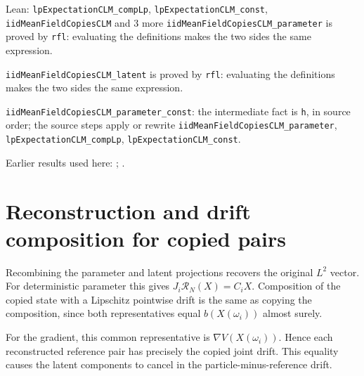 \documentclass[11pt,a4paper]{article}
\begin{document}
\begin{leanbox}{Lean: \texttt{lpExpectationCLM\_\allowbreak{}compLp}, \texttt{lpExpectationCLM\_\allowbreak{}const}, \texttt{iidMeanFieldCopiesCLM} and 3 more}
\texttt{iid\allowbreak{}Mean\allowbreak{}Field\allowbreak{}Copies\allowbreak{}CLM\_\allowbreak{}parameter} is proved by \texttt{rfl}: evaluating the definitions makes the two sides the same expression.



\texttt{iid\allowbreak{}Mean\allowbreak{}Field\allowbreak{}Copies\allowbreak{}CLM\_\allowbreak{}latent} is proved by \texttt{rfl}: evaluating the definitions makes the two sides the same expression.



\texttt{iid\allowbreak{}Mean\allowbreak{}Field\allowbreak{}Copies\allowbreak{}CLM\_\allowbreak{}parameter\_\allowbreak{}const}: the intermediate fact is \texttt{h}, in source order; the source steps apply or rewrite \texttt{iid\allowbreak{}Mean\allowbreak{}Field\allowbreak{}Copies\allowbreak{}CLM\_\allowbreak{}parameter}, \texttt{lp\allowbreak{}Expectation\allowbreak{}CLM\_\allowbreak{}comp\allowbreak{}Lp}, \texttt{lp\allowbreak{}Expectation\allowbreak{}CLM\_\allowbreak{}const}.
\end{leanbox}


Earlier results used here: \cite[Section~3.1.1]{LangevinLean2026IPLA}; \cite[Section~3.11.1]{LangevinLean2026IPLA}.

\section{\texorpdfstring{Reconstruction and drift composition for copied pairs}{Reconstruction and drift composition for copied pairs}}


Recombining the parameter and latent projections recovers the original \(L^2\) vector. For deterministic parameter this gives \(J_i\mathcal R_N(X)=C_iX\). Composition of the copied state with a Lipschitz pointwise drift is the same as copying the composition, since both representatives equal \(b(X(\omega_i))\) almost surely.



For the gradient, this common representative is \(\nabla V(X(\omega_i))\). Hence each reconstructed reference pair has precisely the copied joint drift. This equality causes the latent components to cancel in the particle-minus-reference drift.
\end{document}
